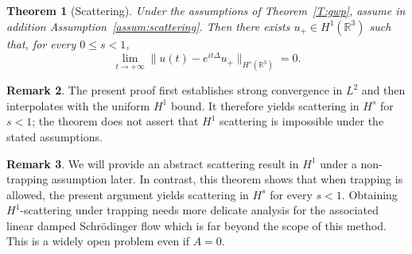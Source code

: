 \documentclass[10pt%
]{amsart}
\numberwithin{equation}{section}
\newcommand{\R}{\mathbb{R}}
\newtheorem{theorem}{Theorem}[section]
\theoremstyle{definition}
\newtheorem{remark}[theorem]{Remark}
\begin{document}
	\begin{theorem}[Scattering]\label{T:main}
		Under the assumptions of Theorem~\ref{T:gwp}, assume in addition Assumption~\ref{assum:scattering}. Then there exists $u_+\in H^1(\R^3)$ such that, for every $0\le s<1$,
		\begin{equation}\label{equ:sca}
			\lim_{t\to+\infty}\|u(t)-e^{it\Delta}u_+\|_{H^s(\R^3)}=0.
		\end{equation}
	\end{theorem}

	\begin{remark}
		The present proof first establishes strong convergence in $L^2$ and then interpolates with the uniform $H^1$ bound. It therefore yields scattering in $H^s$ for $s<1$; the theorem does not assert that $H^1$ scattering is impossible under the stated assumptions.
	\end{remark}
\begin{remark}
  We will provide an abstract scattering result in $H^1$ under a non-trapping assumption later. In contrast, this theorem shows that when trapping is allowed, the present argument yields scattering in $H^s$
for every $s<1$. Obtaining $H^1$-scattering under trapping needs more delicate analysis for the associated linear damped Schr\"odinger flow which is far beyond the scope of this method. This is a widely open problem even if $A=0$. 

\end{remark}
\end{document}
